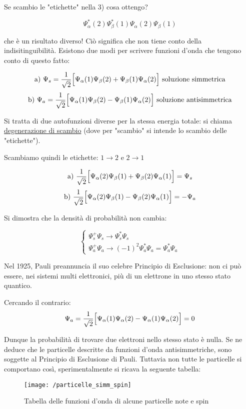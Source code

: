 Se scambio le "etichette" nella 3) cosa ottengo?

$$ \Psi_\alpha^\ast(2) \Psi_\beta^\ast(1) \Psi_\alpha(2)  \Psi_\beta(1) $$

che è un risultato diverso! Ciò significa che non tiene conto della indisitinguibilità.
Esistono due modi per scrivere funzioni d'onda che tengono conto di questo fatto:

$$ \mbox{a) } \Psi_s = \frac{1}{\sqrt{2}} \Bigl[ \Psi_\alpha(1) \Psi_\beta(2) + \Psi_\beta(1) \Psi_\alpha(2) \Bigr] \mbox{ soluzione simmetrica} $$
$$ \mbox{b) } \Psi_a = \frac{1}{\sqrt{2}} \Bigl[ \Psi_\alpha(1) \Psi_\beta(2) - \Psi_\beta(1) \Psi_\alpha(2) \Bigr] \mbox{ soluzione antisimmetrica} $$

Si tratta di due autofunzioni diverse per la stessa energia totale: si chiama \underline{degenerazione di scambio}
(dove per "scambio" si intende lo scambio delle "etichette").

Scambiamo quindi le etichette: 
$ 1 \to 2 $ e $ 2 \to 1 $

$$ \mbox{a) } \frac{1}{\sqrt{2}} \Bigl[ \Psi_\alpha(2) \Psi_\beta(1) + \Psi_\beta(2) \Psi_\alpha(1) \Bigr] = \Psi_s $$
$$ \mbox{b) } \frac{1}{\sqrt{2}} \Bigl[ \Psi_\alpha(2) \Psi_\beta(1) - \Psi_\beta(2) \Psi_\alpha(1) \Bigr] = - \Psi_a $$

Si dimostra che la densità di probabilità non cambia:

\begin{equation}
\begin{cases}
	\Psi_s^+ \Psi_s \to \Psi_s^\ast \Psi_s \\
	\Psi_a^+ \Psi_a \to (-1)^2 \Psi_a^\ast \Psi_a = \Psi_a^\ast \Psi_a
\end{cases}
\end{equation}

Nel 1925, Pauli preannuncia il suo celebre Principio di Esclusione: non ci può essere, nei sistemi multi elettronici, più di un elettrone in uno stesso stato quantico.

Cercando il contrario:
$$ \Psi_a = \frac{1}{\sqrt{2}} \Bigl[ \Psi_\alpha(1) \Psi_\alpha(2) - \Psi_\alpha(1) \Psi_\alpha(2) \Bigr] = 0 $$

Dunque la probabilità di trovare due elettroni nello stesso stato è nulla.
Se ne deduce che le particelle descritte da funzioni d'onda antisimmetriche, sono soggette al Principio di Esclusione di Pauli.
Tuttavia non tutte le particelle si comportano così, sperimentalmente si ricava la seguente tabella:

\begin{figure}[h]
\centering
\texttt{[image: /particelle\_simm\_spin]}
\caption{Tabella delle funzioni d'onda di alcune particelle note e spin}
\end{figure}

